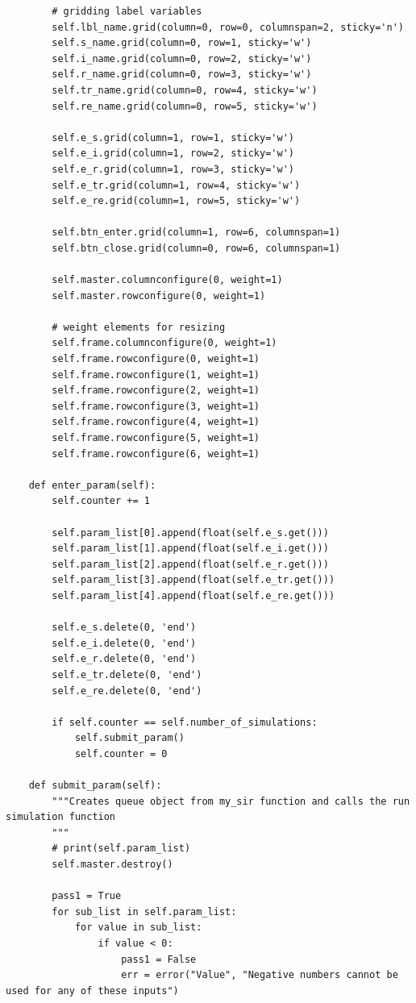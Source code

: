 \documentclass[11pt, a4paper]{article}
\begin{document}
\begin{lstlisting}
        # gridding label variables
        self.lbl_name.grid(column=0, row=0, columnspan=2, sticky='n')
        self.s_name.grid(column=0, row=1, sticky='w')
        self.i_name.grid(column=0, row=2, sticky='w')
        self.r_name.grid(column=0, row=3, sticky='w')
        self.tr_name.grid(column=0, row=4, sticky='w')
        self.re_name.grid(column=0, row=5, sticky='w')

        self.e_s.grid(column=1, row=1, sticky='w')
        self.e_i.grid(column=1, row=2, sticky='w')
        self.e_r.grid(column=1, row=3, sticky='w')
        self.e_tr.grid(column=1, row=4, sticky='w')
        self.e_re.grid(column=1, row=5, sticky='w')

        self.btn_enter.grid(column=1, row=6, columnspan=1)
        self.btn_close.grid(column=0, row=6, columnspan=1)

        self.master.columnconfigure(0, weight=1)
        self.master.rowconfigure(0, weight=1)

        # weight elements for resizing
        self.frame.columnconfigure(0, weight=1)
        self.frame.rowconfigure(0, weight=1)
        self.frame.rowconfigure(1, weight=1)
        self.frame.rowconfigure(2, weight=1)
        self.frame.rowconfigure(3, weight=1)
        self.frame.rowconfigure(4, weight=1)
        self.frame.rowconfigure(5, weight=1)
        self.frame.rowconfigure(6, weight=1)

    def enter_param(self):
        self.counter += 1

        self.param_list[0].append(float(self.e_s.get()))
        self.param_list[1].append(float(self.e_i.get()))
        self.param_list[2].append(float(self.e_r.get()))
        self.param_list[3].append(float(self.e_tr.get()))
        self.param_list[4].append(float(self.e_re.get()))

        self.e_s.delete(0, 'end')
        self.e_i.delete(0, 'end')
        self.e_r.delete(0, 'end')
        self.e_tr.delete(0, 'end')
        self.e_re.delete(0, 'end')

        if self.counter == self.number_of_simulations:
            self.submit_param()
            self.counter = 0

    def submit_param(self):
        """Creates queue object from my_sir function and calls the run simulation function
        """
        # print(self.param_list)
        self.master.destroy()

        pass1 = True
        for sub_list in self.param_list:
            for value in sub_list:
                if value < 0:
                    pass1 = False
                    err = error("Value", "Negative numbers cannot be used for any of these inputs")


\end{lstlisting}
\end{document}
